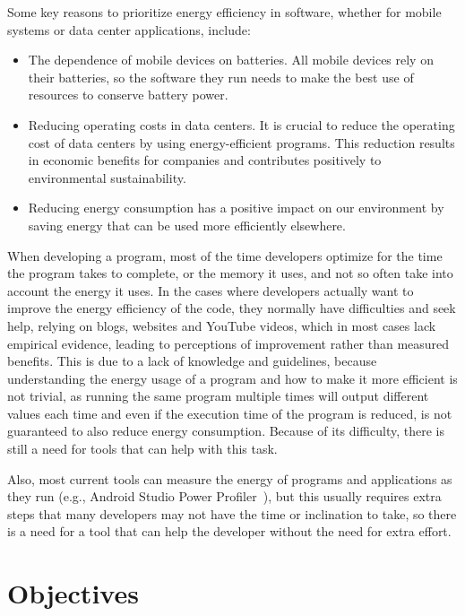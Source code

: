 Some key reasons to prioritize energy efficiency in software, whether for mobile systems or data center applications, include:

\begin{itemize}
  \item The dependence of mobile devices on batteries. All mobile devices rely on their batteries, so the software they run needs to make the best use of resources to conserve battery power.
  \item Reducing operating costs in data centers. It is crucial to reduce the operating cost of data centers by using energy-efficient programs. This reduction results in economic benefits for companies and contributes positively to environmental sustainability. 
  \item Reducing energy consumption has a positive impact on our environment by saving energy that can be used more efficiently elsewhere. 
\end{itemize}

When developing a program, most of the time developers optimize for the time the program takes to complete, or the memory it uses, and not so often take into account the energy it uses. 
In the cases where developers actually want to improve the energy efficiency of the code, they normally have difficulties and seek help, relying on blogs, websites and YouTube videos, which in most cases lack empirical evidence, leading to perceptions of improvement rather than measured benefits\cite{10.1145/3154384}. This is due to a lack of knowledge and guidelines, because understanding the energy usage of a program and how to make it more efficient is not trivial, as running the same program multiple times will output different values each time and even if the execution time of the program is reduced, is not guaranteed to also reduce energy consumption. Because of its difficulty, there is still a need for tools that can help with this task\cite{10.1145/2597073.2597110}. 

Also, most current tools can measure the energy of programs and applications as they run (e.g., Android Studio Power Profiler~\cite{android_power_profiler}), but this usually requires extra steps that many developers may not have the time or inclination to take, so there is a need for a tool that can help the developer without the need for extra effort\cite{10.1145/3154384}.

\section{Objectives}

